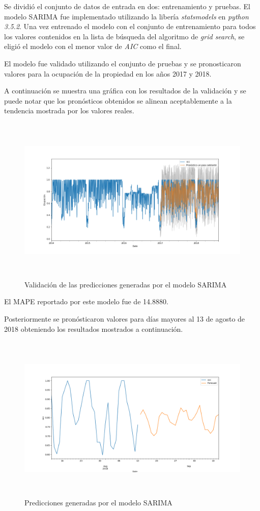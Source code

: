 Se dividió el conjunto de datos de entrada en dos: entrenamiento y pruebas. El modelo SARIMA fue implementado utilizando la libería \emph{statsmodels} en \emph{python 3.5.2}. Una vez entrenado el modelo con el conjunto de entrenamiento para todos los valores contenidos en la lista de búsqueda del algoritmo de \emph{grid search}, se eligió el modelo con el menor valor de \emph{AIC} como el final.

El modelo fue validado utilizando el conjunto de pruebas y se pronosticaron valores para la ocupación de la propiedad en los años 2017 y 2018.

A continuación se muestra una gráfica con los resultados de la validación y se puede notar que los pronósticos obtenidos se alinean aceptablemente a la tendencia mostrada por los valores reales.

\begin{figure}[H]
  \centering
      \includegraphics[width=\maxwidth,height=8cm]{figures/ARIMA_predTest.png}    
  \caption{Validación de las predicciones generadas por el modelo SARIMA}
\end{figure}

El MAPE reportado por este modelo fue de 14.8880.

Posteriormente se pronósticaron valores para días mayores al 13 de agosto de 2018 obteniendo los resultados mostrados a continuación.

\begin{figure}[H]
  \centering
      \includegraphics[width=\maxwidth,height=8cm]{figures/ArimaPred.png}    
  \caption{Predicciones generadas por el modelo SARIMA}
\end{figure}

